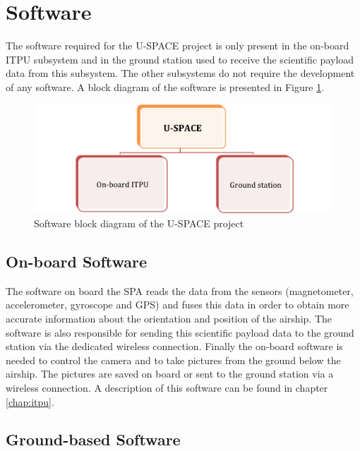 \section{Software}
\label{sec:intro_software}

\enlargethispage{2.0em}

The software required for the \ac{U-SPACE} project is only present in the on-board \ac{ITPU} subsystem and in the ground station used to receive the scientific payload data from this subsystem. The other subsystems do not require the development of any software. A block diagram of the software is presented in Figure \ref{fig:software_block}.

\begin{figure}[h!]
\centering
\includegraphics[width=\textwidth]{figures/software_block.png}
\caption{Software block diagram of the U-SPACE project}
\label{fig:software_block}
\end{figure}

\subsection{On-board Software}

The software on board the \ac{SPA} reads the data from the sensors (magnetometer, accelerometer, gyroscope and \ac{GPS}) and fuses this data in order to obtain more accurate information about the orientation and position of the airship. The software is also responsible for sending this scientific payload data to the ground station via the dedicated wireless connection. Finally the on-board software is needed to control the camera and to take pictures from the ground below the airship. The pictures are saved on board or sent to the ground station via a wireless connection. A description of this software can be found in chapter \ref{chap:itpu}.

\subsection{Ground-based Software}

